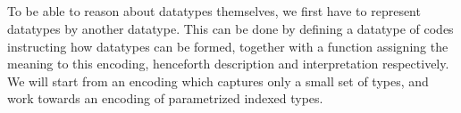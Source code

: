 \begin{code}[hide] %
\>[0]\AgdaSpace{}%
\AgdaSpace{}%
\<%
\\
%
\\[\AgdaEmptyExtraSkip]%
\>[0]\AgdaSpace{}%
\AgdaSpace{}%
\AgdaSpace{}%
\AgdaSpace{}%
\AgdaSymbol{(}\AgdaSpace{}%
\AgdaSpace{}%
\AgdaSymbol{)}\<%
\\
\>[0]\AgdaSpace{}%
\AgdaSpace{}%
\AgdaSpace{}%
\AgdaSpace{}%
\AgdaSymbol{(}\AgdaSpace{}%
\AgdaSpace{}%
\AgdaSymbol{;}\AgdaSpace{}%
\AgdaSpace{}%
\AgdaSpace{}%
\AgdaSymbol{;}\AgdaSpace{}%
\AgdaSpace{}%
\AgdaSpace{}%
\AgdaSymbol{)}\<%
\\
\>[0]\AgdaSpace{}%
\AgdaSpace{}%
\<%
\\
\>[0]\AgdaSpace{}%
\AgdaSpace{}%
\<%
\\
\>[0]\AgdaSpace{}%
\AgdaSpace{}%
\<%
\\
\>[0]\AgdaSpace{}%
\AgdaSpace{}%
\AgdaSpace{}%
\AgdaSpace{}%
\AgdaSymbol{(}\AgdaSymbol{)}\<%
\\
\>[0]\AgdaSpace{}%
\AgdaSpace{}%
\<%
\\
\>[0]\AgdaSpace{}%
\AgdaSpace{}%
\<%
\end{code}

To be able to reason about datatypes themselves, we first have to represent datatypes by another datatype.
This can be done by defining a datatype of codes instructing how datatypes can be formed, together with a function assigning the meaning to this encoding, henceforth description and interpretation respectively. We will start from an encoding which captures only a small set of types, and work towards an encoding of parametrized indexed types.
\begin{code}[hide]%
\>[0]\AgdaSpace{}%
\AgdaSpace{}%
\<%
\end{code}

